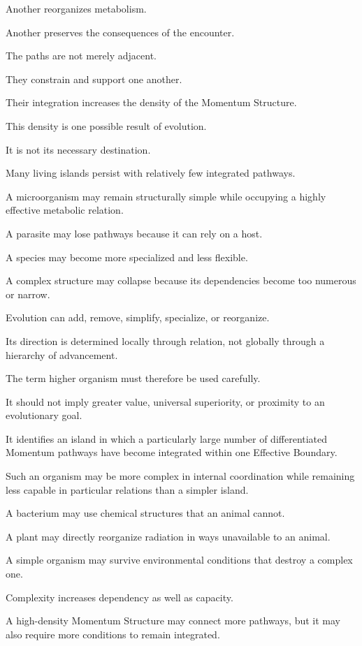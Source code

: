 Another reorganizes metabolism.

Another preserves the consequences of the encounter.

The paths are not merely adjacent.

They constrain and support one another.

Their integration increases the density of the Momentum Structure.

This density is one possible result of evolution.

It is not its necessary destination.

Many living islands persist with relatively few integrated pathways.

A microorganism may remain structurally simple while occupying a highly effective metabolic relation.

A parasite may lose pathways because it can rely on a host.

A species may become more specialized and less flexible.

A complex structure may collapse because its dependencies become too numerous or narrow.

Evolution can add, remove, simplify, specialize, or reorganize.

Its direction is determined locally through relation, not globally through a hierarchy of advancement.

The term higher organism must therefore be used carefully.

It should not imply greater value, universal superiority, or proximity to an evolutionary goal.

It identifies an island in which a particularly large number of differentiated Momentum pathways have become integrated within one Effective Boundary.

Such an organism may be more complex in internal coordination while remaining less capable in particular relations than a simpler island.

A bacterium may use chemical structures that an animal cannot.

A plant may directly reorganize radiation in ways unavailable to an animal.

A simple organism may survive environmental conditions that destroy a complex one.

Complexity increases dependency as well as capacity.

A high-density Momentum Structure may connect more pathways, but it may also require more conditions to remain integrated.

